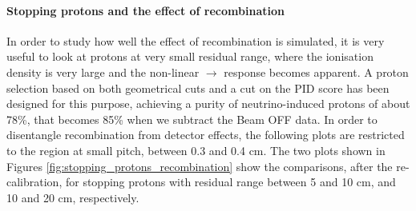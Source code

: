 \paragraph{Stopping protons and the effect of recombination}
In order to study how well the effect of recombination is simulated, it is very useful to look at protons at very small residual range, where the ionisation density is very large and the non-linear \dedx $\rightarrow$ \dqdx response becomes apparent.
A proton selection based on both geometrical cuts and a cut on the PID score has been designed for this purpose, achieving a purity of neutrino-induced protons of about 78\%, that becomes 85\% when we subtract the Beam OFF data.
In order to disentangle recombination from detector effects, the following plots are restricted to the region at small pitch, between 0.3 and 0.4 cm.
The two plots shown in Figures \ref{fig:stopping_protons_recombination} show the comparisons, after the re-calibration, for stopping protons with residual range between 5 and 10 cm, and 10 and 20 cm, respectively.

